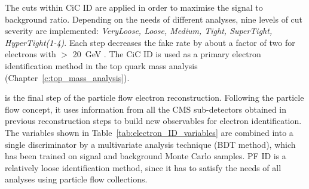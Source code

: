 \begin{description}[wide=\parindent]




The cuts within CiC ID are applied in order to maximise the signal to background ratio. Depending on the needs of
different analyses, nine levels of cut severity are implemented: \textit{VeryLoose, Loose, Medium, Tight, SuperTight,
HyperTight(1-4)}. Each step decreases the fake rate by about a factor of two for electrons with \ET$>$ \SI{20}{\GeV}
\autocite{CiC_ID}. The CiC ID is used as a primary electron identification method in the top quark mass analysis
(Chapter~\ref{c:top_mass_analysis}).

 \item[Particle flow ID] \autocite{PF} is the final step of the particle flow electron reconstruction. Following the
particle flow concept, it uses information from all the CMS sub-detectors obtained in previous reconstruction steps to
build new observables for electron identification. The variables shown in Table~\ref{tab:electron_ID_variables} are
combined into a single discriminator by a multivariate analysis technique (BDT method), which has been trained on signal
and background Monte Carlo samples. PF ID is a relatively loose identification method, since it has to satisfy the needs
of all analyses using particle flow collections.


\end{description}
